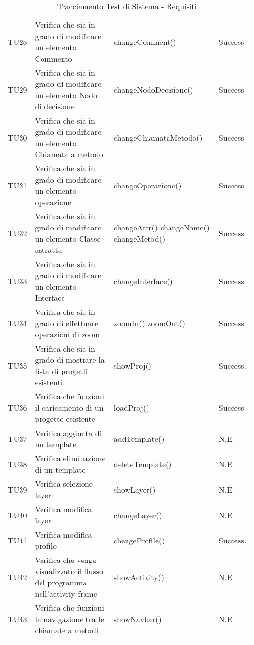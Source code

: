 \begin{longtable}{p{2cm}!{\VRule[1pt]}p{5cm}!{\VRule[1pt]}p{4.5cm}!{\VRule[1pt]}p{1.5cm}}
TU28 & Verifica che sia in grado di modificare un elemento Commento & changeComment() & Success  \\ 
TU29 & Verifica che sia in grado di modificare un elemento Nodo di decisione & changeNodoDecisione() & Success  \\ 
TU30 & Verifica che sia in grado di modificare un elemento Chiamata a metodo & changeChiamataMetodo() & Success  \\ 
TU31 & Verifica che sia in grado di modificare un elemento operazione & changeOperazione() & Success  \\ 
TU32 & Verifica che sia in grado di modificare un elemento Classe astratta & changeAttr() \newline changeNome() \newline changeMetod() & Success  \\ 
TU33 & Verifica che sia in grado di modificare un elemento Interface & changeInterface() & Success  \\ 
TU34 & Verifica che sia in grado di effettuare operazioni di zoom & zoomIn() \newline zoomOut() & Success  \\ 
TU35 & Verifica che sia in grado di mostrare la lista di progetti esistenti & showProj() & Success. \\ 
TU36 & Verifica che funzioni il caricamento di un progetto esistente & loadProj() & Success  \\ 
TU37 & Verifica aggiunta di un template & addTemplate() & N.E. \\ 
TU38 & Verifica eliminazione di un template & deleteTemplate() & N.E. \\ 
TU39 & Verifica selezione layer & showLayer() & N.E. \\ 
TU40 & Verifica modifica layer & changeLayer() & N.E. \\ 
TU41 & Verifica modifica profilo & chengeProfile() & Success. \\ 
TU42 & Verifica che venga visualizzato il flusso del programma nell’activity frame & showActivity() & N.E. \\ 
TU43 & Verifica che funzioni la navigazione tra le chiamate a metodi & showNavbar() & N.E. \\ 





\caption{Tracciamento Test di Sistema - Requisiti}
\end{longtable}